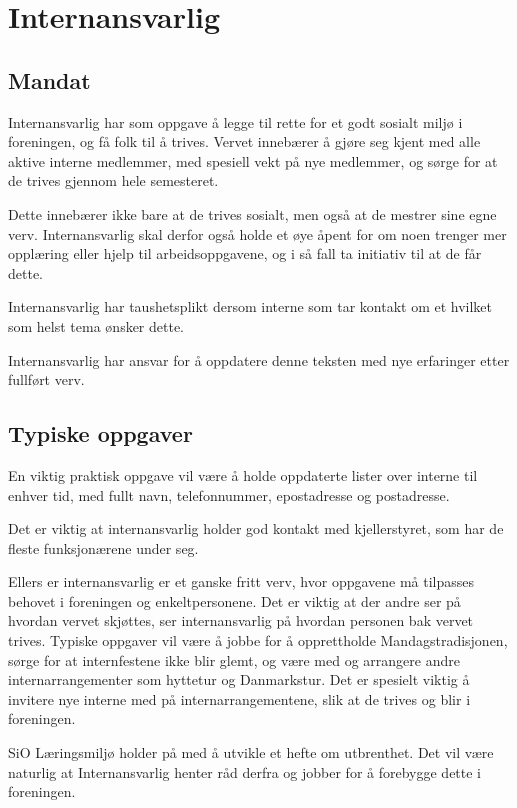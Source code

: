 \section{Internansvarlig}

\subsection{Mandat}
Internansvarlig har som oppgave å legge til rette for et godt sosialt miljø
i foreningen, og få folk til å trives. Vervet innebærer å gjøre seg kjent
med alle aktive interne medlemmer, med spesiell vekt på nye medlemmer,
og sørge for at de trives gjennom hele semesteret.

Dette innebærer ikke bare at de trives sosialt, men også at de mestrer sine
egne verv. Internansvarlig skal derfor også holde et øye åpent for om noen
trenger mer opplæring eller hjelp til arbeidsoppgavene, og i så fall ta
initiativ til at de får dette.

Internansvarlig har taushetsplikt dersom interne som tar kontakt om et
hvilket som helst tema ønsker dette.

Internansvarlig har ansvar for å oppdatere denne teksten med nye erfaringer etter fullført verv.


\subsection{Typiske oppgaver}
En viktig praktisk oppgave vil være å holde oppdaterte lister over interne til
enhver tid, med fullt navn, telefonnummer, epostadresse og postadresse.

Det er viktig at internansvarlig holder god kontakt med kjellerstyret,
som har de fleste funksjonærene under seg.

Ellers er internansvarlig er et ganske fritt verv, hvor oppgavene må tilpasses
behovet i foreningen og enkeltpersonene. Det er viktig at der andre ser
på hvordan vervet skjøttes, ser internansvarlig på hvordan personen bak
vervet trives. Typiske oppgaver vil være å jobbe for å opprettholde
Mandagstradisjonen, sørge for at internfestene ikke blir glemt,
og være med og arrangere andre internarrangementer som hyttetur og
Danmarkstur. Det er spesielt viktig å invitere nye interne med på
internarrangementene, slik at de trives og blir i foreningen.

SiO Læringsmiljø holder på med å utvikle et hefte om utbrenthet.
Det vil være naturlig at Internansvarlig henter råd derfra og
jobber for å forebygge dette i foreningen.

